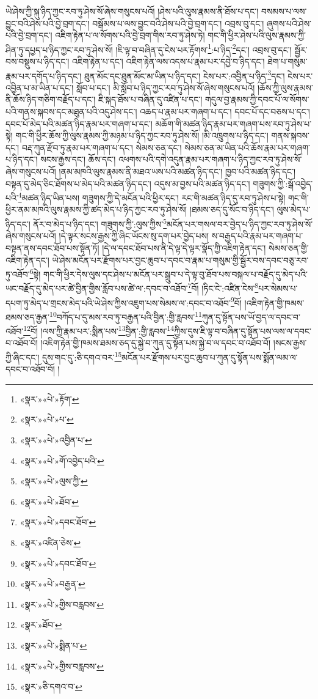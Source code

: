 ཡེ་ཤེས་ཀྱི་སྐུ་ཉིད་ཀྱང་རབ་ཏུ་ཤེས་སོ་ཞེས་གསུངས་པའོ། །ཤེས་པའི་ལུས་རྣམས་ནི་ཐོས་པ་དང་། བསམས་པ་ལས་བྱུང་བའི་ཤེས་པའི་བྱེ་བྲག་དང་། བསྒོམས་པ་ལས་བྱུང་བའི་ཤེས་པའི་བྱེ་བྲག་དང་། འབྲས་བུ་དང་། ཞུགས་པའི་ཤེས་པའི་བྱེ་བྲག་དང་། འཇིག་རྟེན་པ་ལ་སོགས་པའི་བྱེ་བྲག་གིས་རབ་ཏུ་ཤེས་ཏེ། གང་གི་ཕྱིར་ཤེས་པའི་ལུས་རྣམས་ཀྱི་ཤིན་ཏུ་དཔྱད་པ་ཉིད་ཀྱང་རབ་ཏུ་ཤེས་སོ། །ཇི་ལྟ་བ་བཞིན་དུ་ངེས་པར་རྟོགས་\footnote{«སྣར་»«པེ་»རྟོག་}:པ་ཉིད་\footnote{«སྣར་»«པེ་»པ་}དང་། འབྲས་བུ་དང་། སྦྱོར་བས་བསྡུས་པ་ཉིད་དང་། འཇིག་རྟེན་པ་དང་། འཇིག་རྟེན་ལས་འདས་པ་རྣམ་པར་དབྱེ་བ་ཉིད་དང་། ཐེག་པ་གསུམ་རྣམ་པར་དགོད་པ་ཉིད་དང་། ཐུན་མོང་དང་ཐུན་མོང་མ་ཡིན་པ་ཉིད་དང་། ངེས་པར་:འབྱིན་པ་ཉིད་\footnote{«སྣར་»«པེ་»འབྱིན་པ་}དང་། ངེས་པར་འབྱིན་པ་མ་ཡིན་པ་དང་། སློབ་པ་དང་། མི་སློབ་པ་ཉིད་ཀྱང་རབ་ཏུ་ཤེས་སོ་ཞེས་གསུངས་པའོ། །ཆོས་ཀྱི་ལུས་རྣམས་ནི་ཆོས་ཉིད་གཅིག་བརྗོད་པ་དང་། ཇི་སྐད་ཐོས་པ་བཞིན་དུ་འཛིན་པ་དང་། གདུལ་བྱ་རྣམས་ཀྱི་དབང་པོ་ལ་སོགས་པའི་གནས་སྐབས་དང་མཐུན་པའི་འདུ་ཤེས་དང་། འཆད་པ་རྣམ་པར་གཞག་པ་དང་། དབང་པོ་དང་བཅས་པ་དང་། དབང་པོ་མེད་པའི་མཚན་ཉིད་རྣམ་པར་གཞག་པ་དང་། མཆོག་གི་མཚན་ཉིད་རྣམ་པར་གཞག་པས་རབ་ཏུ་ཤེས་པ་སྟེ། གང་གི་ཕྱིར་ཆོས་ཀྱི་ལུས་རྣམས་ཀྱི་མཉམ་པ་ཉིད་ཀྱང་རབ་ཏུ་ཤེས་སོ། །མི་འཁྲུགས་པ་ཉིད་དང་། གནས་སྐབས་དང་། བརྡ་ཀུན་རྫོབ་ཏུ་རྣམ་པར་གཞག་པ་དང་། སེམས་ཅན་དང་། སེམས་ཅན་མ་ཡིན་པའི་ཆོས་རྣམ་པར་གཞག་པ་ཉིད་དང་། སངས་རྒྱས་དང་། ཆོས་དང་། འཕགས་པའི་དགེ་འདུན་རྣམ་པར་གཞག་པ་ཉིད་ཀྱང་རབ་ཏུ་ཤེས་སོ་ཞེས་གསུངས་པའོ། །ནམ་མཁའི་ལུས་རྣམས་ནི་མཐའ་ཡས་པའི་མཚན་ཉིད་དང་། ཁྱབ་པའི་མཚན་ཉིད་དང་། བསྟན་དུ་མེད་ཅིང་ཐོགས་པ་མེད་པའི་མཚན་ཉིད་དང་། འདུས་མ་བྱས་པའི་མཚན་ཉིད་དང་། གཟུགས་ཀྱི་:སྒོ་འབྱེད་པའི་\footnote{«སྣར་»«པེ་»གོ་འབྱེད་པའི་}མཚན་ཉིད་ཡིན་པས། གཟུགས་ཀྱི་དེ་མངོན་པའི་ཕྱིར་དང་། རང་གི་མཚན་ཉིད་དུ་རབ་ཏུ་ཤེས་པ་སྟེ། གང་གི་ཕྱིར་ནམ་མཁའི་ལུས་རྣམས་ཀྱི་ཚད་མེད་པ་ཉིད་ཀྱང་རབ་ཏུ་ཤེས་སོ། །ཐམས་ཅད་དུ་སོང་བ་ཉིད་དང་། ལུས་མེད་པ་ཉིད་དང་། ནོར་བ་མེད་པ་ཉིད་དང་། གཟུགས་ཀྱི་:ལུས་ཀྱིས་\footnote{«སྣར་»«པེ་»ལུས་ཀྱི་}མངོན་པར་གསལ་བར་བྱེད་པ་ཉིད་ཀྱང་རབ་ཏུ་ཤེས་སོ་ཞེས་གསུངས་པའོ། །དེ་ལྟར་སངས་རྒྱས་ཀྱི་ཞིང་ཡོངས་སུ་དག་པར་བྱེད་པས། ས་བརྒྱད་པའི་རྣམ་པར་གཞག་པ་བསྟན་ནས་དབང་ཐོབ་པས་སྟོན་ཏོ། །དེ་ལ་དབང་ཐོབ་པས་ནི་དེ་ལྟ་དེ་ལྟར་སྣོད་ཀྱི་འཇིག་རྟེན་དང་། སེམས་ཅན་གྱི་འཇིག་རྟེན་དང་། ཡེ་ཤེས་མངོན་པར་རྫོགས་པར་བྱང་ཆུབ་པ་དབང་བ་རྣམ་པ་གསུམ་གྱི་སྦྱོར་བས་དབང་བཅུ་རབ་ཏུ་འཐོབ་\footnote{«སྣར་»«པེ་»ཐོབ་}སྟེ། གང་གི་ཕྱིར་དེས་ལུས་དང་ཤེས་པ་མངོན་པར་སྒྲུབ་པ་དེ་ལྟ་བུ་ཐོབ་པས་བསྐལ་པ་བརྗོད་དུ་མེད་པའི་ཡང་བརྗོད་དུ་མེད་པར་ཚེ་བྱིན་གྱིས་རློབ་པས་ཚེ་ལ་:དབང་བ་འཐོབ་\footnote{«སྣར་»«པེ་»དབང་ཐོབ་}བོ། །ཏིང་ངེ་:འཛིན་ངེས་\footnote{«སྣར་»འཛིན་ཅེས་}པར་སེམས་པ་དཔག་ཏུ་མེད་པ་གྲངས་མེད་པའི་ཡེ་ཤེས་ཀྱིས་འཇུག་པས་སེམས་ལ་:དབང་བ་འཐོབ་\footnote{«སྣར་»«པེ་»དབང་ཐོབ་}བོ། །འཇིག་རྟེན་གྱི་ཁམས་ཐམས་ཅད་རྒྱན་\footnote{«སྣར་»«པེ་»བརྒྱན་}བཀོད་པ་དུ་མས་རབ་ཏུ་བརྒྱན་པའི་བྱིན་:གྱི་རླབས་\footnote{«སྣར་»«པེ་»གྱིས་བརླབས་}ཀུན་དུ་སྟོན་པས་ཡོ་བྱད་ལ་དབང་བ་འཐོབ་\footnote{«སྣར་»ཐོབ་}བོ། །ལས་ཀྱི་རྣམ་པར་:སྨིན་པས་\footnote{«སྣར་»«པེ་»སྨིན་པ་}བྱིན་:གྱི་རླབས་\footnote{«སྣར་»«པེ་»གྱིས་བརླབས་}ཀྱིས་དུས་ཇི་ལྟ་བ་བཞིན་དུ་སྟོན་པས་ལས་ལ་དབང་བ་འཐོབ་བོ། །འཇིག་རྟེན་གྱི་ཁམས་ཐམས་ཅད་དུ་སྐྱེ་བ་ཀུན་དུ་སྟོན་པས་སྐྱེ་བ་ལ་དབང་བ་འཐོབ་བོ། །སངས་རྒྱས་ཀྱི་ཞིང་དང་། དུས་གང་དུ་:ཅི་དགའ་བར་\footnote{«སྣར་»ཅི་དགའ་བ་}མངོན་པར་རྫོགས་པར་བྱང་ཆུབ་པ་ཀུན་དུ་སྟོན་པས་སྨོན་ལམ་ལ་དབང་བ་འཐོབ་བོ། །
